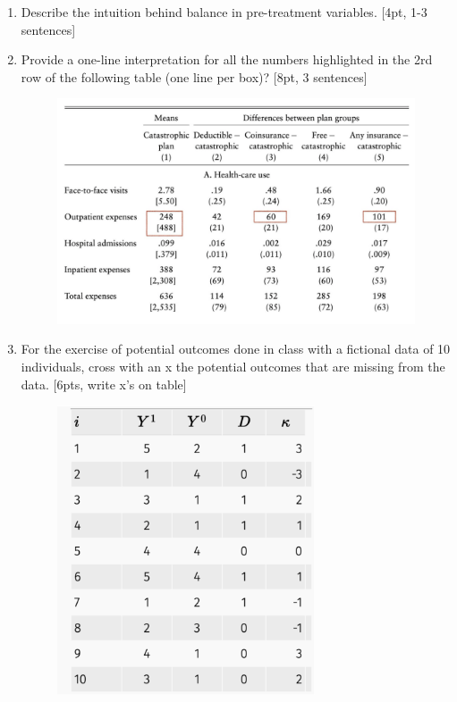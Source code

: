 \documentclass[12pt,notitlepage]{article}
\begin{document}
\begin{enumerate}
\item Describe the intuition behind balance in pre-treatment variables. [4pt, 1-3 sentences] 
\vspace{3cm}


\item Provide a one-line interpretation for all the numbers highlighted in the 2rd row of the following table (one line per box)? [8pt, 3 sentences] 
\begin{figure}[H]
    \centering
    \includegraphics[width=6in]{Figures/midterm_table.png}
    \caption{}
    \label{}
\end{figure}
\vspace{2cm}

\item For the exercise of potential outcomes done in class with a fictional data of 10 individuals, cross with an x the potential outcomes that are missing from the data. [6pts, write x's on table] 
\begin{figure}[H]
    \centering
    \includegraphics[width=3in]{Figures/midterm_outcome.png}
    \caption{}
    \label{}
\end{figure}
\vspace{3cm}



\end{enumerate}
\end{document}

